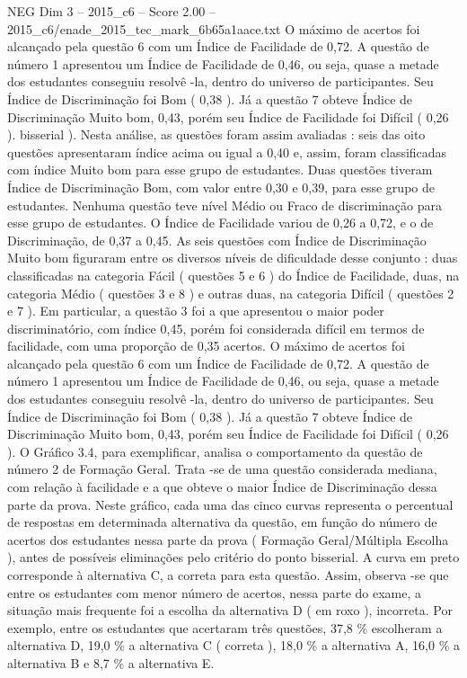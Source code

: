 \begin{textsample}{NEG Dim 3 – 2015\_c6 – Score 2.00 – 2015\_c6/enade\_2015\_tec\_mark\_6b65a1aace.txt}
O máximo de acertos foi alcançado pela questão 6 com um Índice de Facilidade de 0,72.
A questão de número 1 apresentou um Índice de Facilidade de 0,46, ou seja, quase a metade dos estudantes conseguiu resolvê -la, dentro do universo de participantes.
Seu Índice de Discriminação foi Bom ( 0,38 ).
Já a questão 7 obteve Índice de Discriminação Muito bom, 0,43, porém seu Índice de Facilidade foi Difícil ( 0,26 ). bisserial ).
Nesta análise, as questões foram assim avaliadas : seis das oito questões apresentaram índice acima ou igual a 0,40 e, assim, foram classificadas com índice Muito bom para esse grupo de estudantes.
Duas questões tiveram Índice de Discriminação Bom, com valor entre 0,30 e 0,39, para esse grupo de estudantes.
Nenhuma questão teve nível Médio ou Fraco de discriminação para esse grupo de estudantes.
O Índice de Facilidade variou de 0,26 a 0,72, e o de Discriminação, de 0,37 a 0,45.
As seis questões com Índice de Discriminação Muito bom figuraram entre os diversos níveis de dificuldade desse conjunto : duas classificadas na categoria Fácil ( questões 5 e 6 ) do Índice de Facilidade, duas, na categoria Médio ( questões 3 e 8 ) e outras duas, na categoria Difícil ( questões 2 e 7 ).
Em particular, a questão 3 foi a que apresentou o maior poder discriminatório, com índice 0,45, porém foi considerada difícil em termos de facilidade, com uma proporção de 0,35 acertos.
O máximo de acertos foi alcançado pela questão 6 com um Índice de Facilidade de 0,72.
A questão de número 1 apresentou um Índice de Facilidade de 0,46, ou seja, quase a metade dos estudantes conseguiu resolvê -la, dentro do universo de participantes.
Seu Índice de Discriminação foi Bom ( 0,38 ).
Já a questão 7 obteve Índice de Discriminação Muito bom, 0,43, porém seu Índice de Facilidade foi Difícil ( 0,26 ).
O Gráfico 3.4, para exemplificar, analisa o comportamento da questão de número 2 de Formação Geral.
Trata -se de uma questão considerada mediana, com relação à facilidade e a que obteve o maior Índice de Discriminação dessa parte da prova.
Neste gráfico, cada uma das cinco curvas representa o percentual de respostas em determinada alternativa da questão, em função do número de acertos dos estudantes nessa parte da prova ( Formação Geral/Múltipla Escolha ), antes de possíveis eliminações pelo critério do ponto bisserial.
A curva em preto corresponde à alternativa C, a correta para esta questão.
Assim, observa -se que entre os estudantes com menor número de acertos, nessa parte do exame, a situação mais frequente foi a escolha da alternativa D ( em roxo ), incorreta.
Por exemplo, entre os estudantes que acertaram três questões, 37,8 \% escolheram a alternativa D, 19,0 \% a alternativa C ( correta ), 18,0 \% a alternativa A, 16,0 \% a alternativa B e 8,7 \% a alternativa E.

\end{textsample}
